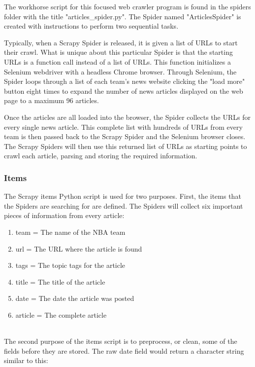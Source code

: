 \documentclass[5p,authoryear]{elsarticle}
\begin{document}
The workhorse script for this focused web crawler program is found in the spiders folder with the title "articles\_spider.py". The Spider named "ArticlesSpider" is created with instructions to perform two sequential tasks. 

Typically, when a Scrapy Spider is released, it is given a list of URLs to start their crawl. What is unique about this particular Spider is that the starting URLs is a function call instead of a list of URLs. This function initializes a Selenium webdriver with a headless Chrome browser. Through Selenium, the Spider loops through a list of each team's news website clicking the "load more" button eight times to expand the number of news articles displayed on the web page to a maximum 96 articles. 

Once the articles are all loaded into the browser, the Spider collects the URLs for every single news article. This complete list with hundreds of URLs from every team is then passed back to the Scrapy Spider and the Selenium browser closes. The Scrapy Spiders will then use this returned list of URLs as starting points to crawl each article, parsing and storing the required information. 





\subsubsection{Items}

The Scrapy items Python script is used for two purposes. First, the items that the Spiders are searching for are defined. The Spiders will collect six important pieces of information from every article:

 \begin{enumerate}
 \item team  = The name of the NBA team
 \item url = The URL where the article is found
 \item tags = The topic tags for the article
 \item title = The title of the article
 \item date = The date the article was posted
 \item article = The complete article
\end{enumerate} \\

The second purpose of the items script is to preprocess, or clean, some of the fields before they are stored. The raw date field would return a character string similar to this: 
\end{document}
